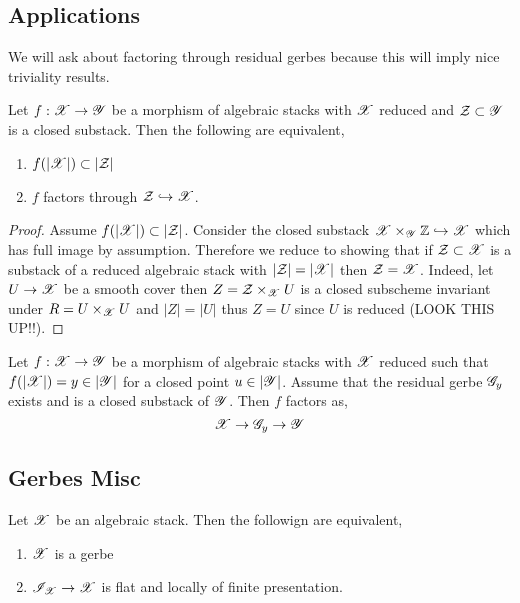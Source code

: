 \documentclass[12pt]{article}
\begin{document}
\subsection{Applications}

We will ask about factoring through residual gerbes because this will imply nice triviality results.

\begin{lemma}
Let $f : \mathscr{X} \to \mathscr{Y}$ be a morphism of algebraic stacks with $\mathscr{X}$ reduced and $\mathcal{Z} \subset \mathscr{Y}$ is a closed substack. Then the following are equivalent,
\begin{enumerate}
\item $f(|\mathscr{X}|) \subset |\mathcal{Z}|$
\item $f$ factors through $\mathcal{Z} \hookrightarrow \mathscr{X}$.
\end{enumerate}
\end{lemma}

\begin{proof}
Assume $f(|\mathscr{X}|) \subset |\mathcal{Z}|$. Consider the closed substack $\mathscr{X} \times_{\mathscr{Y}} \mathbb{Z} \hookrightarrow \mathscr{X}$ which has full image by assumption. Therefore we reduce to showing that if $\mathcal{Z} \subset \mathscr{X}$ is a substack of a reduced algebraic stack with $|\mathcal{Z}| = |\mathscr{X}|$ then $\mathcal{Z} = \mathscr{X}$. Indeed, let $U \to \mathscr{X}$ be a smooth cover then $Z = \mathcal{Z} \times_{\mathscr{X}} U$ is a closed subscheme invariant under $R = U \times_{\mathscr{X}} U$ and $|Z| = |U|$ thus $Z = U$ since $U$ is reduced (LOOK THIS UP!!).
\end{proof}

\begin{cor}
Let $f : \mathscr{X} \to \mathscr{Y}$ be a morphism of algebraic stacks with $\mathscr{X}$ reduced such that $f(|\mathscr{X}|) = y \in |\mathscr{Y}|$ for a closed point $u \in |\mathscr{Y}|$. Assume that the residual gerbe $\mathscr{G}_y$ exists and is a closed substack of $\mathscr{Y}$. Then $f$ factors as,
\[ \mathscr{X} \to \mathscr{G}_y \to \mathscr{Y} \]
\end{cor}

\subsection{Gerbes Misc}

\begin{prop}
Let $\mathscr{X}$ be an algebraic stack. Then the followign are equivalent,
\begin{enumerate}
\item $\mathscr{X}$ is a gerbe
\item $\mathscr{I}_{\mathscr{X}} \to \mathscr{X}$ is flat and locally of finite presentation.
\end{enumerate}
\end{prop}
\end{document}
